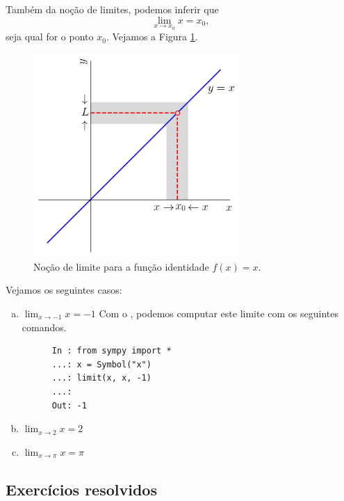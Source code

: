 Também da noção de limites, podemos inferir que
\begin{equation}
  \lim_{x\to x_0} x = x_0,
\end{equation}
seja qual for o ponto $x_0$. Vejamos a Figura \ref{fig:lim_funid}.

\begin{figure}[H]
  \centering
  \includegraphics[width=0.7\textwidth]{./cap_lim/dados/fig_lim_funid/fig_lim_funid}
  \caption{Noção de limite para a função identidade $f(x)=x$.}
  \label{fig:lim_funid}
\end{figure}

\begin{ex}
  Vejamos os seguintes casos:
  \begin{enumerate}[a)]
  \item $\displaystyle \lim_{x\to -1} x = -1$
    \ifispython
    Com o {\python}, podemos computar este limite com os seguintes comandos.
    \begin{lstlisting}
      In : from sympy import *
      ...: x = Symbol("x")
      ...: limit(x, x, -1)
      ...: 
      Out: -1
    \end{lstlisting}
    \fi
  \item $\displaystyle \lim_{x\to 2} x = 2$
  \item $\displaystyle \lim_{x\to \pi} x = \pi$
  \end{enumerate}
\end{ex}

\subsection*{Exercícios resolvidos}

